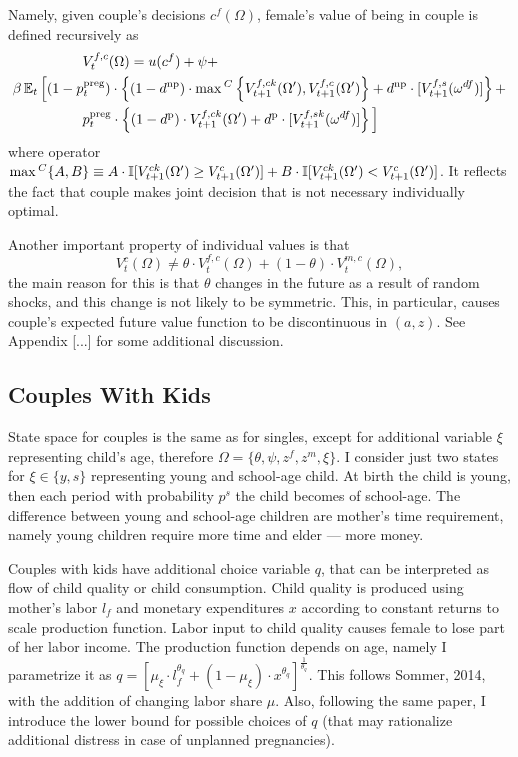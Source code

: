 Namely, given couple's decisions $c^f(\Omega)$, female's value of being in couple is defined recursively as
\begin{align}
& \hspace{5em}  V^{f,c}_t(\Omega) =    u(c^f) + \psi +  \\   \nonumber
 &  \beta \operatorname{\mathbb{E}}_t \Big[   (1 - p^{\text{preg}}_t)\cdot \left\{ (1-d^{\text{np}})\cdot \max{}^C \left\{ V^{f,ck}_{t+1}(\Omega'),V^{f,c}_{t+1}(\Omega')\right\} + d^{\text{np}}\cdot [ V_{t+1}^{f,s}(\omega^{df})]\right\}  +  \\  \nonumber
& \hspace{5em} p^{\text{preg}}_t\cdot \left\{ (1-d^{\text{p}})\cdot V^{f,ck}_{t+1}(\Omega') + d^{\text{p}}\cdot [ V_{t+1}^{f,sk}(\omega^{df}) ]\right\} \Big] 
\end{align}
where operator $\max{}^C\{A,B\} \equiv A\cdot \mathbb{I}[V^{ck}_{t+1}(\Omega')\geq V^{c}_{t+1}(\Omega')] + B\cdot \mathbb{I}[V^{ck}_{t+1}(\Omega')< V^{c}_{t+1}(\Omega')]$. It reflects the fact that couple makes joint decision that is not necessary individually optimal.

Another important property of individual values is that
\begin{equation} V^{c}_t(\Omega) \neq \theta\cdot V^{f,c}_t(\Omega) + (1-\theta)\cdot V^{m,c}_t(\Omega),\label{tht_noneq}\end{equation}
the main reason for this is that $\theta$ changes in the future as a result of random shocks, and this change is not likely to be symmetric. This, in particular, causes couple's expected future value function to be discontinuous in $(a,z)$. See Appendix [...] for some additional discussion.

\subsection{Couples With Kids}
State space for couples is the same as for singles, except for additional variable $\xi$ representing child's age, therefore $\Omega = \{\theta,\psi,z^f,z^m,\xi\}$. I consider just two states for $\xi \in \{y,s\}$ representing young and school-age child. At birth the child is young, then each period with probability $p^{s}$ the child becomes of school-age. The difference between young and school-age children are mother's time requirement, namely young children require more time and elder --- more money.

Couples with kids have additional choice variable $q$, that can be interpreted as flow of child quality or child consumption. Child quality is produced using mother's labor $l_f$ and monetary expenditures $x$ according to constant returns to scale production function. Labor input to child quality causes female to lose part of her labor income. The production function depends on age, namely I parametrize it as $q = [\mu_\xi\cdot l_f^{\theta_q} + (1-\mu_\xi)\cdot x^{\theta_q}]^{\frac1{\theta_q}}$. This follows Sommer, 2014, with the addition of changing labor share $\mu$. Also, following the same paper, I introduce the lower bound for possible choices of $q$ (that may rationalize additional distress in case of unplanned pregnancies).

